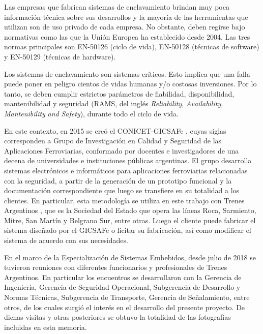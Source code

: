 		Las empresas que fabrican sistemas de enclavamiento \cite{cite5,cite6,cite7,cite8,cite9,cite10,cite12,cite13,cite14,cite15} brindan muy poca información técnica sobre sus desarrollos y la mayoría de las herramientas que utilizan son de uso privado de cada empresa. No obstante, deben regirse bajo normativas como las que la Unión Europea ha establecido desde 2004. Las tres normas principales son EN-50126 \cite{EN50126} (ciclo de vida), EN-50128 \cite{EN50128} (técnicas de software) y EN-50129 \cite{EN50129} (técnicas de hardware). %
		
		Los sistemas de enclavamiento son sistemas críticos. Esto implica que una falla puede poner en peligro cientos de vidas humanas y/o costosas inversiones. Por lo tanto, se deben cumplir estrictos parámetros de fiabilidad, disponibilidad, mantenibilidad y seguridad (RAMS, del inglés \textit{Reliability}, \textit{Availability}, \textit{Mantenibility} \textit{and} \textit{Safety}), durante todo el ciclo de vida.
		
		En este contexto, en 2015 se creó el CONICET-GICSAFe \cite{GICSAFE}, cuyas siglas corresponden a Grupo de Investigación en Calidad y Seguridad de las Aplicaciones Ferroviarias, conformado por docentes e investigadores de una decena de universidades e instituciones públicas argentinas. El grupo desarrolla sistemas electrónicos e informáticos para aplicaciones ferroviarias relacionadas con la seguridad, a partir de la generación de un prototipo funcional y la documentación correspondiente que luego se transfiere en su totalidad a los clientes. En particular, esta metodología se utiliza en este trabajo con Trenes Argentinos \cite{Trenes}, que es la Sociedad del Estado que opera las líneas Roca, Sarmiento, Mitre, San Martín y Belgrano Sur, entre otras. Luego el cliente puede fabricar el sistema diseñado por el GICSAFe o licitar su fabricación, así como modificar el sistema de acuerdo con sus necesidades.   
	
		En el marco de la Especialización de Sistemas Embebidos, desde julio de 2018 se tuvieron reuniones con diferentes funcionarios y profesionales de Trenes Argentinos. En particular los encuentros se desarrollaron con la Gerencia de Ingeniería, Gerencia de Seguridad Operacional, Subgerencia de Desarrollo y Normas Técnicas, Subgerencia de Transporte, Gerencia de Señalamiento, entre otros, de los cuales surgió el interés en el desarrollo del presente proyecto. De dichas visitas y otras posteriores se obtuvo la totalidad de las fotografías incluidas en esta memoria.
			 	
